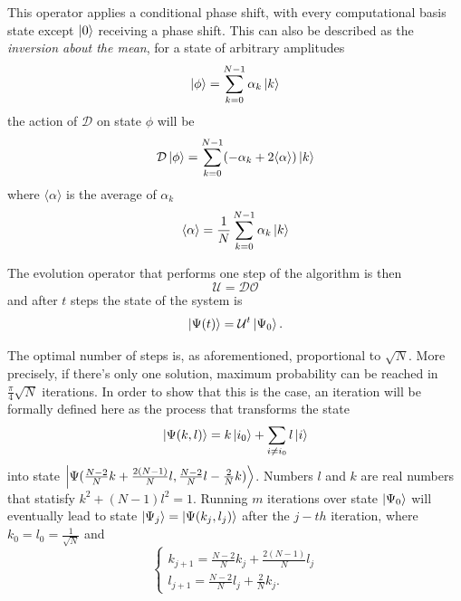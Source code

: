 \documentclass[../../dissertation.tex]{subfiles}
\begin{document}
This operator applies a conditional phase shift, with every computational basis state except $\ket{0}$ receiving a phase shift. This can also be described as the \textit{inversion about the mean}, for a state of arbitrary amplitudes
\begin{equation}
	\ket{\phi} = \sum_{k=0}^{N-1} \alpha_k\ket{k}
\end{equation}
the action of $\mathcal{D}$ on state $\phi$ will be
\begin{equation}
	\mathcal{D}\ket{\phi} = \sum_{k=0}^{N-1}(-\alpha_k + 2\langle \alpha \rangle)\ket{k}
\end{equation}
where $\langle \alpha \rangle$ is the average of $\alpha_k$
\begin{equation}
	\langle \alpha \rangle = \frac{1}{N} \sum_{k=0}^{N-1} \alpha_k\ket{k}
\end{equation}
\par
The evolution operator that performs one step of the algorithm is then
\begin{equation}
	\mathcal{U} = \mathcal{D}\mathcal{O}
\end{equation}
and after $t$ steps the state of the system is
\begin{equation}
	\ket{\Psi(t)} = \mathcal{U}^t\ket{\Psi_0}.
	\label{eq:groverFinalState}
\end{equation}\par
The optimal number of steps is, as aforementioned, proportional to $\sqrt{N}$. More precisely, if there's only one solution, maximum probability can be reached in $\frac{\pi}{4}\sqrt{N}$ iterations. In order to show that this is the case, an iteration will be formally defined here as the process that transforms the state
\begin{equation}
	\ket{\Psi(k,l)} = k\ket{i_0} + \sum_{i\neq i_0}l\ket{i}
\end{equation}
into state $\ket{\Psi(\frac{N-2}{N}k + \frac{2(N-1)}{N}l, \frac{N-2}{N}l - \frac{2}{N}k)}$. Numbers $l$ and $k$ are real numbers that statisfy $k^2 + (N-1)l^2=1$. Running $m$ iterations over state $\ket{\Psi_0}$ will eventually lead to state $\ket{\Psi_j} = \ket{\Psi(k_j,l_j)}$ after the $j-th$ iteration, where $k_0 = l_0 = \frac{1}{\sqrt{N}}$ and
\begin{equation}
	\begin{cases}
		k_{j+1} = \frac{N-2}{N}k_j + \frac{2(N-1)}{N}l_j
		\\l_{j+1} = \frac{N-2}{N}l_j + \frac{2}{N}k_j.
	\end{cases}\label{eq:groverKandJ1}
\end{equation}
\end{document}
